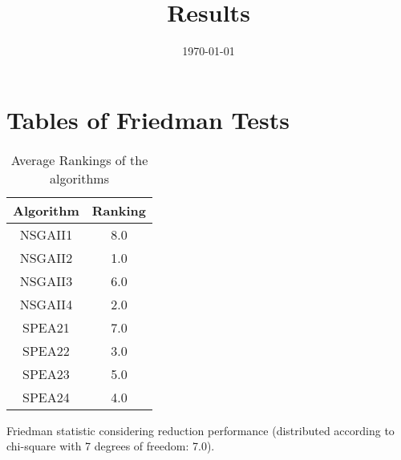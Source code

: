 \documentclass{article}
\title{Results}
\author{}
\date{\today}
\begin{document}
\oddsidemargin 0in \topmargin 0in\maketitle
\section{Tables of Friedman Tests}
\begin{table}[!htp]
\centering
\caption{Average Rankings of the algorithms
}\begin{tabular}{c|c}
Algorithm&Ranking\\
\hline
NSGAII1&8.0\\
NSGAII2&1.0\\
NSGAII3&6.0\\
NSGAII4&2.0\\
SPEA21&7.0\\
SPEA22&3.0\\
SPEA23&5.0\\
SPEA24&4.0\\
\end{tabular}
\end{table}


Friedman statistic considering reduction performance (distributed according to chi-square with 7 degrees of freedom: 7.0).
\end{document}
